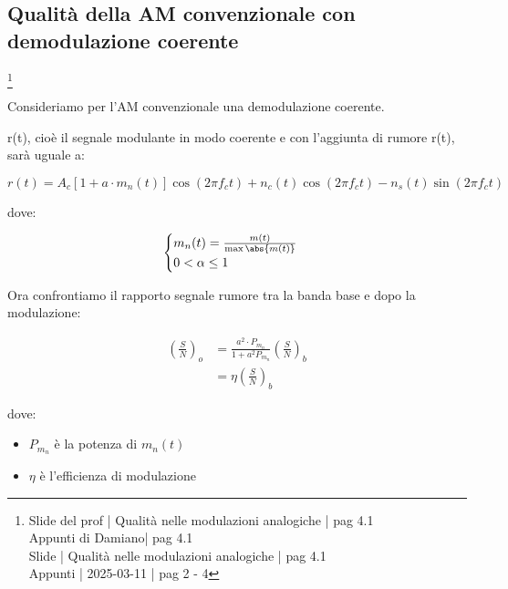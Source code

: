 \newpage 

\subsection{Qualità della AM convenzionale con demodulazione coerente }
\footnote{Slide del prof | Qualità nelle modulazioni analogiche | pag 4.1 \\  
Appunti di Damiano| pag 4.1 \\
Slide | Qualità nelle modulazioni analogiche | pag 4.1 \\
Appunti | 2025-03-11 | pag 2 - 4
} 

Consideriamo per l'AM convenzionale una demodulazione coerente. \newline 

r(t), cioè il segnale modulante in modo coerente e con l'aggiunta di rumore r(t), sarà uguale a: 

{
    \Large 
    \begin{equation}
        r(t)
        =
        A_c \left[ 1 + a \cdot m_n (t)\right] 
        \cos(2 \pi f_c t)
        +
        n_c (t) \cos(2 \pi f_c t) 
        - 
        n_s (t) \sin(2 \pi f_c t) 
    \end{equation}
}

dove: 

{
    \Large 
    \begin{equation}
        \begin{cases}
            m_n(t) = \frac{m(t)}{\max \abs{m(t)}}
            \\
            0 < \alpha \le 1
        \end{cases}    
    \end{equation}
}

Ora confrontiamo il rapporto segnale rumore tra la banda base e dopo la modulazione: 

{
    \Large 
    \begin{equation}
        \begin{split}
            \left(  \frac{S}{N} \right)_{o}
            &= 
            \frac{a^{2} \cdot P_{m_n}}{1 + a^{2} P_{m_n}}
            \left(  \frac{S}{N} \right)_{b}
            \\
            &= 
            \eta 
            \left(  \frac{S}{N} \right)_{b}
        \end{split}
    \end{equation}
}

dove: 

\begin{itemize}
    \item $P_{m_n}$ è la potenza di $m_n (t)$
    \item $\eta$ è l'efficienza di modulazione 
\end{itemize}

